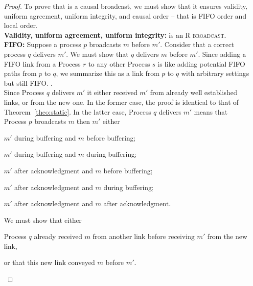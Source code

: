 \begin{proof}
  To prove that \CBROADCAST is a causal broadcast, we must show that it ensures
  validity, uniform agreement, uniform integrity, and causal order -- that is
  FIFO order and local order. \\
  \textbf{Validity, uniform agreement, uniform integrity:} \CBROADCAST is an
  \textsc{R-broadcast}. \\
  \textbf{FIFO:} Suppose a process $p$ broadcasts $m$ before $m'$. Consider that
  a correct process $q$ delivers $m'$. We must show that $q$ delivers $m$ before
  $m'$.  Since adding a FIFO link from a Process $r$ to any other Process $s$ is
  like adding potential FIFO paths from $p$ to $q$, we summarize this as a link
  from $p$ to $q$ with arbitrary settings but still FIFO.  . \\
  Since Process $q$ delivers $m'$ it either received $m'$ from already well
  established links, or from the new one. In the former case, the proof is
  identical to that of Theorem~\ref{theo:static}. In the latter case, Process
  $q$ delivers $m'$ means that Process $p$ broadcasts $m$ then $m'$ either
  \begin{inparaenum}[(i)]
  \item \label{case:one} $m'$ during buffering and $m$ before buffering;
  \item \label{case:two} $m'$ during buffering and $m$ during buffering;
  \item \label{case:three} $m'$ after acknowledgment and $m$ before buffering;
  \item \label{case:four} $m'$ after acknowledgment and $m$ during buffering;
  \item \label{case:five} $m'$ after acknowledgment and $m$ after acknowledgment.
  \end{inparaenum}
  We must show that either 
  \begin{inparaenum}[(1)]
  \item \label{show:one} Process $q$ already received $m$ from another link
    before receiving $m'$ from the new link,
  \item \label{show:two} or that this new link conveyed $m$ before $m'$.
  \end{inparaenum}


\end{proof}
